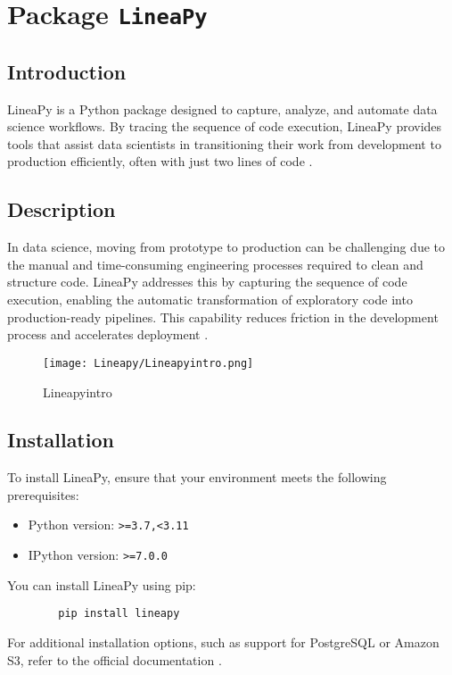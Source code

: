 %
%
	
	\chapter{Package \texttt{LineaPy}}
	
	\section{Introduction} 
		LineaPy is a Python package designed to capture, analyze, and automate data science workflows. By tracing the sequence of code execution, LineaPy provides tools that assist data scientists in transitioning their work from development to production efficiently, often with just two lines of code \cite{lineapy_docs}.
	\section{Description}
		In data science, moving from prototype to production can be challenging due to the manual and time-consuming engineering processes required to clean and structure code. LineaPy addresses this by capturing the sequence of code execution, enabling the automatic transformation of exploratory code into production-ready pipelines. This capability reduces friction in the development process and accelerates deployment \cite{lineapy_github}.
		
		\begin{figure}[h!]
			\centering
			\texttt{[image: Lineapy/Lineapyintro.png]}
			\caption{Lineapyintro}
			\label{fig:Lineapyintro}
		\end{figure}
		
	\section{Installation}
	To install LineaPy, ensure that your environment meets the following prerequisites:
	\begin{itemize}
		\item Python version: \texttt{>=3.7,<3.11}
		\item IPython version: \texttt{>=7.0.0}
	\end{itemize}
	You can install LineaPy using pip:
	\begin{lstlisting}
		pip install lineapy
	\end{lstlisting}
	For additional installation options, such as support for PostgreSQL or Amazon S3, refer to the official documentation \cite{lineapy_github}.
